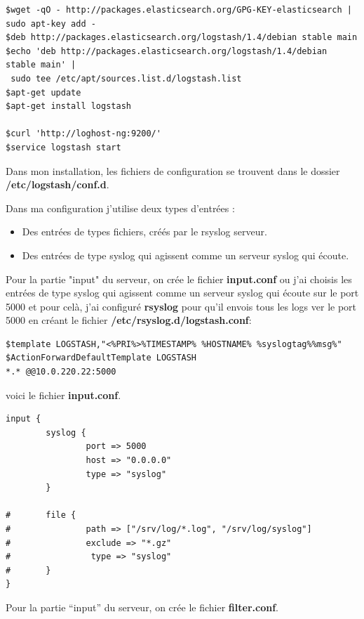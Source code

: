 \documentclass[11pt,a4paper]{article}
\begin{document}
\begin{verbatim}
$wget -qO - http://packages.elasticsearch.org/GPG-KEY-elasticsearch | sudo apt-key add -
$deb http://packages.elasticsearch.org/logstash/1.4/debian stable main
$echo 'deb http://packages.elasticsearch.org/logstash/1.4/debian stable main' | 
 sudo tee /etc/apt/sources.list.d/logstash.list
$apt-get update
$apt-get install logstash
 
$curl 'http://loghost-ng:9200/'
$service logstash start 
\end{verbatim}
Dans mon installation, les fichiers de configuration se trouvent dans le dossier \textbf{/etc/logstash/conf.d}.

Dans ma configuration j’utilise deux types d’entrées :
\begin{itemize}
    \item Des entrées de types fichiers, créés par le rsyslog serveur.
    \item Des entrées de type syslog qui agissent comme un serveur syslog qui écoute.
\end{itemize}

Pour la partie "input" du serveur, on crée le fichier \textbf{input.conf} ou j'ai choisis les entrées de type syslog qui agissent comme un serveur syslog qui écoute sur le port 5000 et pour celà, j'ai configuré \textbf{rsyslog} pour qu'il envois tous les logs ver le port 5000 en créant le fichier \textbf{/etc/rsyslog.d/logstash.conf}:
\begin{verbatim}
$template LOGSTASH,"<%PRI%>%TIMESTAMP% %HOSTNAME% %syslogtag%%msg%"
$ActionForwardDefaultTemplate LOGSTASH
*.* @@10.0.220.22:5000
\end{verbatim}
voici le fichier \textbf{input.conf}.
\begin{verbatim}
input {
        syslog {
                port => 5000
                host => "0.0.0.0"
                type => "syslog"
        }

#       file {
#               path => ["/srv/log/*.log", "/srv/log/syslog"]
#               exclude => "*.gz"
#                type => "syslog"
#       }
}
\end{verbatim}

Pour la partie “input” du serveur, on crée le fichier \textbf{filter.conf}.
\end{document}
